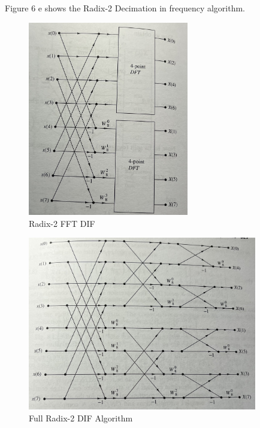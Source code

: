 \documentclass{article} %
\begin{document}
	Figure 6 e shows the Radix-2 Decimation in frequency algorithm.
	\begin{figure}[h]
	\centering
	\includegraphics[width=7cm]{4pt}
	\caption{Radix-2 FFT DIF}
	\end{figure}
	
	\begin{figure}[h]
	\centering
	\includegraphics[width=10cm]{radix4}
	\caption{Full Radix-2 DIF Algorithm}
	\end{figure}

	
\end{document}
